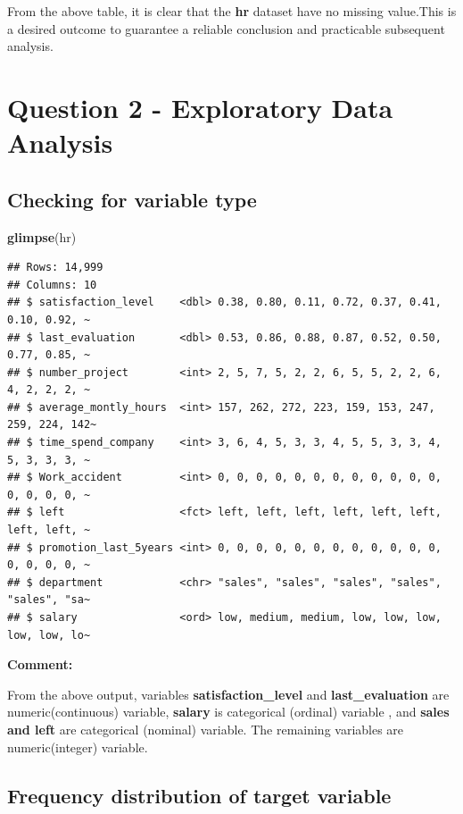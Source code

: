 \documentclass[
  11pt,
]{article}
\newenvironment{Shaded}{\begin{snugshade}}{\end{snugshade}}
\newcommand{\FunctionTok}[1]{\textcolor[rgb]{0.13,0.29,0.53}{\textbf{#1}}}
\newcommand{\NormalTok}[1]{#1}
\begin{document}
From the above table, it is clear that the \textbf{hr} dataset have no
missing value.This is a desired outcome to guarantee a reliable
conclusion and practicable subsequent analysis.

\newpage
\section{Question 2 - Exploratory Data Analysis}

\subsection{Checking for variable type}

\begin{Shaded}
\begin{Highlighting}[]
\FunctionTok{glimpse}\NormalTok{(hr)}
\end{Highlighting}
\end{Shaded}

\begin{verbatim}
## Rows: 14,999
## Columns: 10
## $ satisfaction_level    <dbl> 0.38, 0.80, 0.11, 0.72, 0.37, 0.41, 0.10, 0.92, ~
## $ last_evaluation       <dbl> 0.53, 0.86, 0.88, 0.87, 0.52, 0.50, 0.77, 0.85, ~
## $ number_project        <int> 2, 5, 7, 5, 2, 2, 6, 5, 5, 2, 2, 6, 4, 2, 2, 2, ~
## $ average_montly_hours  <int> 157, 262, 272, 223, 159, 153, 247, 259, 224, 142~
## $ time_spend_company    <int> 3, 6, 4, 5, 3, 3, 4, 5, 5, 3, 3, 4, 5, 3, 3, 3, ~
## $ Work_accident         <int> 0, 0, 0, 0, 0, 0, 0, 0, 0, 0, 0, 0, 0, 0, 0, 0, ~
## $ left                  <fct> left, left, left, left, left, left, left, left, ~
## $ promotion_last_5years <int> 0, 0, 0, 0, 0, 0, 0, 0, 0, 0, 0, 0, 0, 0, 0, 0, ~
## $ department            <chr> "sales", "sales", "sales", "sales", "sales", "sa~
## $ salary                <ord> low, medium, medium, low, low, low, low, low, lo~
\end{verbatim}

\textbf{Comment:}

From the above output, variables \textbf{satisfaction\_level} and
\textbf{last\_evaluation} are numeric(continuous) variable,
\textbf{salary} is categorical (ordinal) variable , and \textbf{sales
and left} are categorical (nominal) variable. The remaining variables
are numeric(integer) variable.

\subsection{Frequency distribution of target variable}
\end{document}
